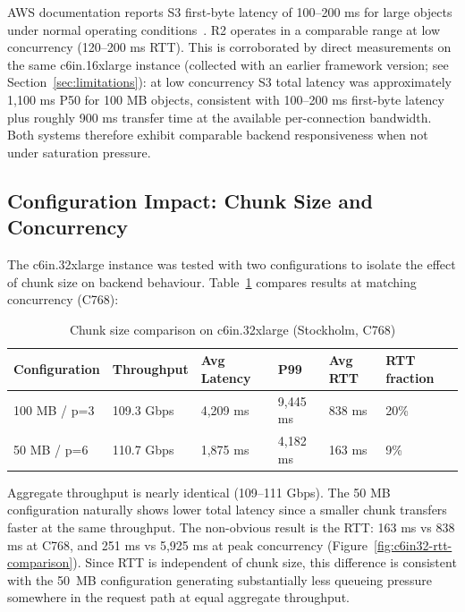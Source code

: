 AWS documentation reports S3 first-byte latency of 100--200 ms for large objects under normal operating conditions~\cite{aws-s3-performance}. R2 operates in a comparable range at low concurrency (120--200 ms RTT). This is corroborated by direct measurements on the same c6in.16xlarge instance (collected with an earlier framework version; see Section~\ref{sec:limitations}): at low concurrency S3 total latency was approximately 1,100 ms P50 for 100 MB objects, consistent with 100--200 ms first-byte latency plus roughly 900 ms transfer time at the available per-connection bandwidth. Both systems therefore exhibit comparable backend responsiveness when not under saturation pressure.

\subsection{Configuration Impact: Chunk Size and Concurrency}

The c6in.32xlarge instance was tested with two configurations to isolate the effect of chunk size on backend behaviour. Table~\ref{tab:chunk-size-comparison} compares results at matching concurrency (C768):

\begin{table}[H]
\centering
\caption{Chunk size comparison on c6in.32xlarge (Stockholm, C768)}
\label{tab:chunk-size-comparison}
\begin{tabular}{p{2.6cm}p{2.4cm}p{2.4cm}p{1.8cm}p{1.8cm}p{2.2cm}}
\hline
\textbf{Configuration} & \textbf{Throughput} & \textbf{Avg Latency} & \textbf{P99} & \textbf{Avg RTT} & \textbf{RTT fraction} \\
\hline
100 MB / p=3 & 109.3 Gbps & 4,209 ms & 9,445 ms & 838 ms  & 20\% \\
50 MB / p=6  & 110.7 Gbps & 1,875 ms & 4,182 ms & 163 ms  & 9\%  \\
\hline
\end{tabular}
\end{table}

Aggregate throughput is nearly identical (109--111 Gbps). The 50 MB configuration naturally shows lower total latency since a smaller chunk transfers faster at the same throughput. The non-obvious result is the RTT: 163 ms vs 838 ms at C768, and 251 ms vs 5,925 ms at peak concurrency (Figure~\ref{fig:c6in32-rtt-comparison}). Since RTT is independent of chunk size, this difference is consistent with the 50~MB configuration generating substantially less queueing pressure somewhere in the request path at equal aggregate throughput.

